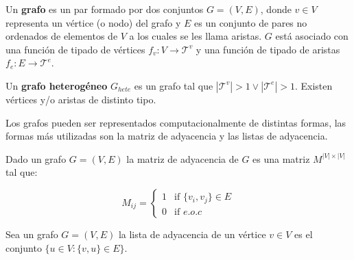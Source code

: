 \begin{definition}
    Un \textbf{grafo} es un par formado por dos conjuntos $G = (V,E)$, 
    donde $v \in V$ representa un v\'ertice (o nodo) del grafo y $E$ es un conjunto
    de pares no ordenados de elementos de $V$ a los cuales se les llama aristas. $G$ est\'a
    asociado con una funci\'on de tipado de v\'ertices $f_v: V \to \mathcal{T}^v$ y 
    una funci\'on de tipado de aristas $f_e : E \to \mathcal{T}^e$. 
\end{definition}



\begin{definition}
    Un \textbf{grafo heterog\'eneo} $G_{hete}$ es un grafo tal 
    que $|\mathcal{T}^v| > 1 \vee |\mathcal{T}^e| > 1$. Existen v\'ertices y/o aristas
    de distinto tipo.
\end{definition}


Los grafos pueden ser representados computacionalmente de distintas formas, las formas
m\'as utilizadas son la matriz de adyacencia y las listas de adyacencia.


\begin{definition}
    Dado un grafo $G = (V,E)$ la matriz de adyacencia de $G$ es una matriz
    $M^{|V|\times|V|}$ tal que:
    
    $$
            M_{ij} =
        \left\{
            \begin{array}{ll}
                1  & \mbox{if } \{v_i, v_j\} \in E \\
                0 & \mbox{if } e.o.c
            \end{array}
        \right.
    $$

\end{definition}


\begin{definition}
    Sea un grafo $G = (V,E)$ la lista de adyacencia de un v\'ertice $v \in V$ es el conjunto
    $\{ u \in V : \{v,u\} \in E \}$.
\end{definition}

